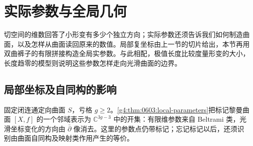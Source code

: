 
% 
% 
% 
% 
% 

\section{实际参数与全局几何}
\label{g4:sec:0604}

切空间的维数回答了小形变有多少个独立方向；实际参数还须告诉我们如何制造曲面，以及怎样从曲面读回原来的数值。局部复坐标由上一节的切片给出，本节再用双曲裤子的有限拼接构造全局实参数。与此相配，极值长度比较度量形变的大小，长度趋零的模型则说明这些参数怎样走向光滑曲面的边界。

\subsection{局部坐标及自同构的影响}
\label{g4:subsec:0604:01}

固定闭连通定向曲面 \(S\)，亏格 \(g\ge2\)。\cref{g4:thm:0603:local-parameters}把标记黎曼曲面 \([X,f]\) 的一个邻域表示为 \(\mathbb C^{3g-3}\) 中的开集：有限维参数来自 Beltrami 类，光滑坐标变化的方向由 \(\bar\partial\) 像消去。这里的参数点仍带标记；忘记标记以后，还须识别由曲面自同构及映射类作用产生的等价。

